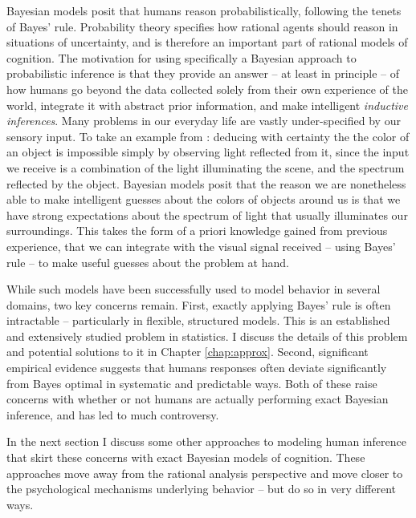 Bayesian models posit that humans reason probabilistically, following the tenets of Bayes' rule. Probability theory specifies how rational agents should reason in situations of uncertainty\cite{hacking2006emergence, gigerenzer1990empire}, and is therefore an important part of rational models of cognition. The motivation for using specifically a Bayesian approach to probabilistic inference is that they provide an answer -- at least in principle -- of how humans go beyond the data collected solely from their own experience of the world, integrate it with abstract prior information, and make intelligent \textit{inductive inferences}. Many problems in our everyday life are vastly under-specified by our sensory input. To take an example from \citet{griffiths2008bayesian}: deducing with certainty the the color of an object is impossible simply by observing light reflected from it, since the input we receive is a combination of the light illuminating the scene, and the spectrum reflected by the object. Bayesian models posit that the reason we are nonetheless able to make intelligent guesses about the colors of objects around us is that we have strong expectations about the spectrum of light that usually illuminates our surroundings. This takes the form of a priori knowledge gained from previous experience, that we can integrate with the visual signal received -- using Bayes' rule -- to make useful guesses about the problem at hand.

While such models have been successfully used to model behavior in several domains, two key concerns remain. First, exactly applying Bayes' rule is often intractable -- particularly in flexible, structured models. This is an established and extensively studied problem in statistics.\cite{Jaakkola1999, andrieu2003introduction} I discuss the details of this problem and potential solutions to it in Chapter \ref{chap:approx}. Second, significant empirical evidence suggests that humans responses often deviate significantly from Bayes optimal in systematic and predictable ways. \citep{tversky1974judgment, slovic1971comparison, grether1980bayes, fischhoff1983hypothesis} Both of these raise concerns with whether or not humans are actually performing exact Bayesian inference, and has led to much controversy. \citep{mellers2001frequency, gigerenzer1996narrow, samuels2012ending} 

In the next section I discuss some other approaches to modeling human inference that skirt these concerns with exact Bayesian models of cognition. These approaches move away from the rational analysis perspective and move closer to the psychological mechanisms underlying behavior\citep{griffiths2012bridging} -- but do so in very different ways.

